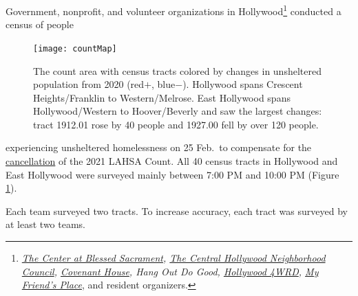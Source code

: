 \documentclass[11pt]{article}
\begin{document}

 Government, nonprofit, and volunteer organizations in Hollywood\footnote{
{\it \href{https://thecenterinhollywood.org}
{The Center at Blessed Sacrament}, \href{https://chnc.org}{The Central Hollywood Neighborhood Council}, 
\href{https://www.covenanthouse.org/spring-meal-match?sourceid=2483460&origin=DHQEI2109EZI0N&utm_source=2103marchmealmatchweb&utm_medium=cpc&utm_campaign=FY21MarchMealMatch&utm_content=bsd2103marchmealmatchweb&gclid=CjwKCAiAp4KCBhB6EiwAxRxbpJA2yM7lM2tyAqjVALZgBGvjnhobCJJ0XmuELFDXzM5xxZ0BqyX1ChoCLi0QAvD_BwE}{Covenant House}, 
Hang Out Do Good, \href{https://hollywood4wrd.live}{Hollywood 4WRD}, 
 \href{https://www.myfriendsplace.org/}{My Friend's Place}}, and resident organizers.} conducted a census 
 of people%
\begin{figure}
	\centering
	\texttt{[image: countMap]}
	\caption{The count area with census tracts colored by  
			changes in unsheltered population from 2020 (red$+$, blue$-$).
			Hollywood spans Crescent Heights/Franklin to Western/Melrose. East Hollywood 
			spans Hollywood/Western to Hoover/Beverly and saw the largest changes:
			tract 1912.01 rose by 40 people and 1927.00 fell by over 120 people.}
	\label{fig:tcomp}
\end{figure}
experiencing unsheltered homelessness on 25 Feb.~to compensate for 
the \href{https://laist.com/latest/post/20201209/LAHSA-cancels-2021-homeless-count-los-angeles-covid-19}
{cancellation} of the 2021 LAHSA Count. All 40 census tracts in Hollywood 
and East Hollywood were surveyed mainly between 7:00 PM and 10:00 PM (Figure \ref{fig:tcomp}). 

Each team surveyed two tracts. To increase accuracy, each tract was surveyed by at 
least two teams.\\
\end{document}
